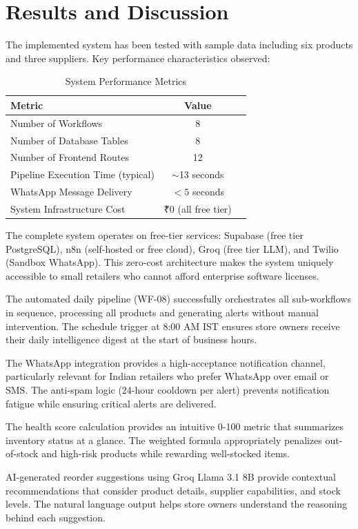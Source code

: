 \documentclass[journal]{IEEEtran}
\begin{document}
\section{Results and Discussion}

The implemented system has been tested with sample data including six products and three suppliers. Key performance characteristics observed:

\begin{table}[htbp]
\centering
\caption{System Performance Metrics}
\begin{tabular}{lcc}
\toprule
\textbf{Metric} & \textbf{Value} \\
\midrule
Number of Workflows & 8 \\
Number of Database Tables & 8 \\
Number of Frontend Routes & 12 \\
Pipeline Execution Time (typical) & $\sim$13 seconds \\
WhatsApp Message Delivery & $< 5$ seconds \\
System Infrastructure Cost & ₹0 (all free tier) \\
\bottomrule
\end{tabular}
\end{table}

The complete system operates on free-tier services: Supabase (free tier PostgreSQL), n8n (self-hosted or free cloud), Groq (free tier LLM), and Twilio (Sandbox WhatsApp). This zero-cost architecture makes the system uniquely accessible to small retailers who cannot afford enterprise software licenses.

The automated daily pipeline (WF-08) successfully orchestrates all sub-workflows in sequence, processing all products and generating alerts without manual intervention. The schedule trigger at 8:00 AM IST ensures store owners receive their daily intelligence digest at the start of business hours.

The WhatsApp integration provides a high-acceptance notification channel, particularly relevant for Indian retailers who prefer WhatsApp over email or SMS. The anti-spam logic (24-hour cooldown per alert) prevents notification fatigue while ensuring critical alerts are delivered.

The health score calculation provides an intuitive 0-100 metric that summarizes inventory status at a glance. The weighted formula appropriately penalizes out-of-stock and high-risk products while rewarding well-stocked items.

AI-generated reorder suggestions using Groq Llama 3.1 8B provide contextual recommendations that consider product details, supplier capabilities, and stock levels. The natural language output helps store owners understand the reasoning behind each suggestion.
\end{document}
